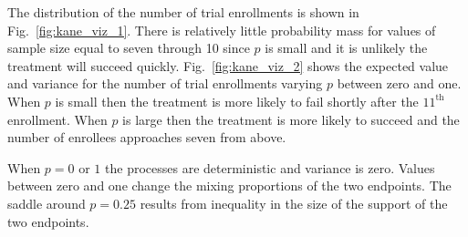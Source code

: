 \documentclass[12pt]{article}
\begin{document}
The distribution of the number of trial enrollments is shown in 
Fig.~\ref{fig:kane_viz_1}. There is relatively little probability mass
for values of sample size equal to seven through 10 since $p$ is small and it 
is unlikely the treatment will succeed quickly.
Fig.~\ref{fig:kane_viz_2} shows the expected value and variance for the
number of trial enrollments varying $p$ between zero and one. When $p$ is
small then the treatment
is more likely to fail shortly after the $11^{\text{th}}$ enrollment.
When $p$ is large then the treatment is more likely to succeed and the 
number of enrollees approaches seven from above. 

When $p=0$ or $1$ the processes are deterministic and variance is zero.
Values between zero and one change the mixing proportions of 
the two endpoints. The saddle around $p=0.25$ results from inequality 
in the size of the support of the two endpoints.

\end{document}

